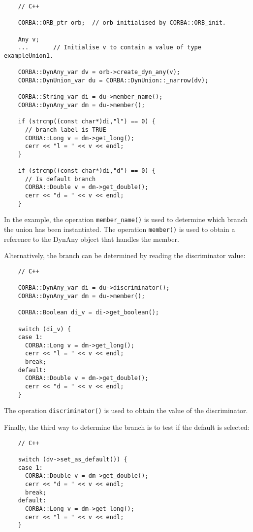\documentclass[11pt,twoside,onecolumn]{book}
\begin{document}
{\small
\begin{verbatim}
    // C++
    
    CORBA::ORB_ptr orb;  // orb initialised by CORBA::ORB_init.
    
    Any v;
    ...       // Initialise v to contain a value of type exampleUnion1.
    
    CORBA::DynAny_var dv = orb->create_dyn_any(v);
    CORBA::DynUnion_var du = CORBA::DynUnion::_narrow(dv);
    
    CORBA::String_var di = du->member_name();
    CORBA::DynAny_var dm = du->member();
    
    if (strcmp((const char*)di,"l") == 0) {
      // branch label is TRUE
      CORBA::Long v = dm->get_long();
      cerr << "l = " << v << endl;
    }
    
    if (strcmp((const char*)di,"d") == 0) {
      // Is default branch
      CORBA::Double v = dm->get_double();
      cerr << "d = " << v << endl;
    }
\end{verbatim}
}

In the example, the operation {\tt member\_name()} is used to determine
which branch the union has been instantiated. The operation {\tt member()}
is used to obtain a reference to the DynAny object that handles the member.

Alternatively, the branch can be determined by reading the discriminator
value:

{\small
\begin{verbatim}
    // C++
    
    CORBA::DynAny_var di = du->discriminator();
    CORBA::DynAny_var dm = du->member();
    
    CORBA::Boolean di_v = di->get_boolean();
    
    switch (di_v) {
    case 1:
      CORBA::Long v = dm->get_long();
      cerr << "l = " << v << endl;
      break;
    default:
      CORBA::Double v = dm->get_double();
      cerr << "d = " << v << endl;
    }
\end{verbatim}
}

The operation {\tt discriminator()} is used to obtain the value of the
discriminator.

Finally, the third way to determine the branch is to test if the default is
selected:

{\small
\begin{verbatim}
    // C++
    
    switch (dv->set_as_default()) {
    case 1:
      CORBA::Double v = dm->get_double();
      cerr << "d = " << v << endl;
      break;
    default:
      CORBA::Long v = dm->get_long();
      cerr << "l = " << v << endl;
    }

\end{verbatim}
}
\end{document}
